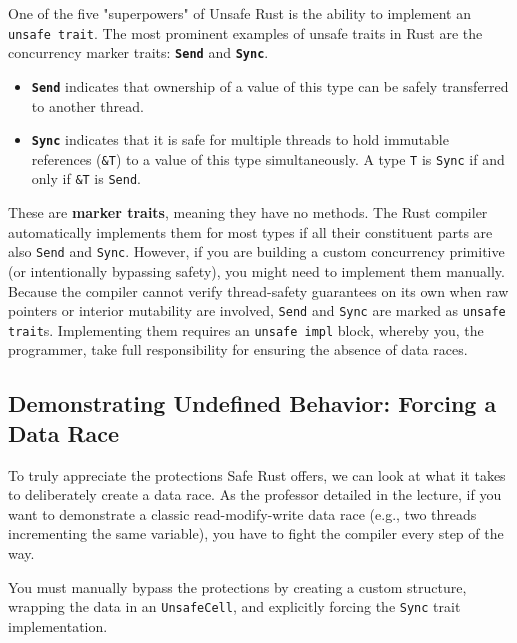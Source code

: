 One of the five "superpowers" of Unsafe Rust is the ability to implement an \texttt{unsafe trait}. The most prominent examples of unsafe traits in Rust are the concurrency marker traits: \textbf{\texttt{Send}} and \textbf{\texttt{Sync}}.

\begin{itemize}
    \item \textbf{\texttt{Send}} indicates that ownership of a value of this type can be safely transferred to another thread.
    \item \textbf{\texttt{Sync}} indicates that it is safe for multiple threads to hold immutable references (\texttt{\&T}) to a value of this type simultaneously. A type \texttt{T} is \texttt{Sync} if and only if \texttt{\&T} is \texttt{Send}.
\end{itemize}

These are \textbf{marker traits}, meaning they have no methods. The Rust compiler automatically implements them for most types if all their constituent parts are also \texttt{Send} and \texttt{Sync}. However, if you are building a custom concurrency primitive (or intentionally bypassing safety), you might need to implement them manually. Because the compiler cannot verify thread-safety guarantees on its own when raw pointers or interior mutability are involved, \texttt{Send} and \texttt{Sync} are marked as \texttt{unsafe trait}s. Implementing them requires an \texttt{unsafe impl} block, whereby you, the programmer, take full responsibility for ensuring the absence of data races.

\subsection{Demonstrating Undefined Behavior: Forcing a Data Race}

To truly appreciate the protections Safe Rust offers, we can look at what it takes to deliberately create a data race. As the professor detailed in the lecture, if you want to demonstrate a classic read-modify-write data race (e.g., two threads incrementing the same variable), you have to fight the compiler every step of the way. 

You must manually bypass the protections by creating a custom structure, wrapping the data in an \texttt{UnsafeCell}, and explicitly forcing the \texttt{Sync} trait implementation.

